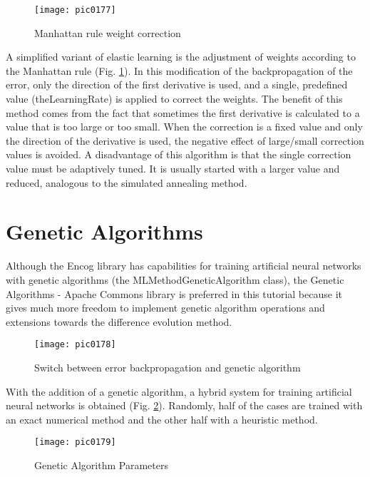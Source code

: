 \begin{figure}[h]
\centering
\texttt{[image: pic0177]}
\caption{Manhattan rule weight correction}
\label{fig:pic0177}
\end{figure}
\FloatBarrier

A simplified variant of elastic learning is the adjustment of weights according to the Manhattan rule (Fig. \ref{fig:pic0177}). In this modification of the backpropagation of the error, only the direction of the first derivative is used, and a single, predefined value (theLearningRate) is applied to correct the weights. The benefit of this method comes from the fact that sometimes the first derivative is calculated to a value that is too large or too small. When the correction is a fixed value and only the direction of the derivative is used, the negative effect of large/small correction values is avoided. A disadvantage of this algorithm is that the single correction value must be adaptively tuned. It is usually started with a larger value and reduced, analogous to the simulated annealing method.

\section{Genetic Algorithms}

Although the Encog library has capabilities for training artificial neural networks with genetic algorithms (the MLMethodGeneticAlgorithm class), the Genetic Algorithms - Apache Commons library is preferred in this tutorial because it gives much more freedom to implement genetic algorithm operations and extensions towards the difference evolution method.

\begin{figure}[h]
\centering
\texttt{[image: pic0178]}
\caption{Switch between error backpropagation and genetic algorithm}
\label{fig:pic0178}
\end{figure}
\FloatBarrier

With the addition of a genetic algorithm, a hybrid system for training artificial neural networks is obtained (Fig. \ref{fig:pic0178}). Randomly, half of the cases are trained with an exact numerical method and the other half with a heuristic method.

\begin{figure}[h]
\centering
\texttt{[image: pic0179]}
\caption{Genetic Algorithm Parameters}
\label{fig:pic0179}
\end{figure}
\FloatBarrier


